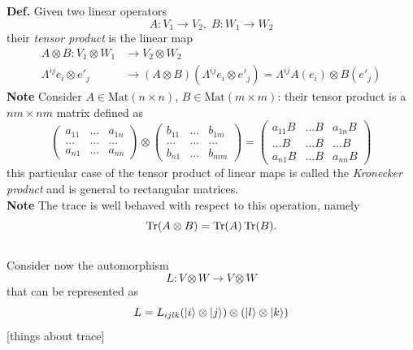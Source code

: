 \textbf{Def.} Given two linear operators
$$A:V_1\to V_2,\; B:W_1\to W_2$$
their \textit{tensor product} is the linear map
\begin{align*}
A\otimes B: V_1\otimes W_1&\to V_2\otimes W_2 \\
\Lambda^{ij}e_i\otimes e'_j&\to
(A\otimes B)(\Lambda^{ij}e_i\otimes e'_j)=\Lambda^{ij}A(e_i)\otimes B(e'_j)
\end{align*}
\textbf{Note} Consider $A\in \text{Mat}(n\times n),\, B\in\text{Mat}(m\times m)$:
their tensor product is a $nm\times nm$ matrix defined as
$$\begin{pmatrix}
    a_{11}&...&a_{1n}\\
    ...&...&...\\
    a_{n1}&...&a_{nn}
\end{pmatrix} \otimes
\begin{pmatrix}
    b_{11}&...&b_{1m}\\
    ...&...&...\\
    b_{n1}&...&b_{mm}
\end{pmatrix}=\begin{pmatrix}
    a_{11}B&...B&a_{1n}B\\
    ...B&...B&...B\\
    a_{n1}B&...B&a_{nn}B
\end{pmatrix}
$$
this particular case of the tensor product of linear maps is called the
\textit{Kronecker product} and is general to rectangular matrices.\\
\textbf{Note} The trace is well behaved with respect to this operation, namely
$$\Tr(A\otimes B) = \Tr(A)\Tr(B).$$\\

Consider now the automorphism
$$
L: V\otimes W\to V\otimes W
$$
that can be represented as
$$L = L_{ijlk}(\ket{i}\otimes\ket{j})\otimes(\ket{l}\otimes\ket{k})$$
[things about trace]


